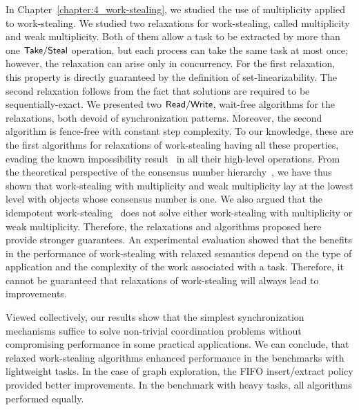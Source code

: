 In Chapter~\ref{chapter:4_work-stealing}, we studied the use of multiplicity applied to work-stealing. We studied two relaxations for work-stealing, called multiplicity and weak multiplicity. Both of them allow a task to be extracted by more than one ${\sf Take}/{\sf Steal}$ operation, but each process can take the same task at most once; however, the relaxation can arise only in concurrency. For the first relaxation, this property is directly guaranteed by the definition of set-linearizability. The second relaxation follows from the fact that solutions are required to be sequentially-exact. We presented two ${\sf Read}/{\sf Write}$, wait-free algorithms for the relaxations, both devoid of \RAW synchronization patterns.
Moreover, the second algorithm is fence-free with constant step complexity. To our knowledge, these are the first algorithms for relaxations of work-stealing having all these properties, evading the known impossibility result~\cite{DBLP_conf_popl_AttiyaGHKMV11} in all their high-level operations. From the theoretical perspective of the consensus number hierarchy~\cite{DBLP_journals_toplas_Herlihy91}, we have thus shown that work-stealing with multiplicity and weak multiplicity lay at the lowest level with objects whose consensus number is one. We also argued that the idempotent work-stealing~\cite{maged.vechev.2009} does not solve either work-stealing with multiplicity or weak multiplicity. Therefore, the relaxations and algorithms proposed here provide stronger guarantees. An experimental evaluation showed that the benefits in the performance of work-stealing with relaxed semantics depend on the type of application and the complexity of the work associated with a task. Therefore, it cannot be guaranteed that relaxations of work-stealing will always lead to improvements.

Viewed collectively, our results show that the simplest synchronization mechanisms suffice to solve non-trivial coordination problems without compromising performance in some practical applications. We can conclude, that relaxed work-stealing algorithms enhanced performance in the benchmarks with lightweight tasks. In the case of graph exploration, the FIFO insert/extract policy provided better improvements. In the benchmark with heavy tasks, all algorithms performed equally.
